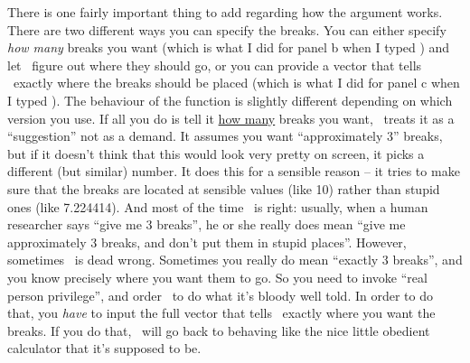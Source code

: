 There is one fairly important thing to add regarding how the  argument works. There are two different ways you can specify the breaks. You can either specify {\it how many} breaks you want (which is what I did for panel b when I typed ) and let \R\ figure out where they should go, or you can provide a vector that tells \R\ exactly where the breaks should be placed (which is what I did for panel c when I typed ). The behaviour of the  function is slightly different depending on which version you use. If all you do is tell it \underline{how many} breaks you want, \R\ treats it as a ``suggestion'' not as a demand. It assumes you want ``approximately 3'' breaks, but if it doesn't think that this would look very pretty on screen, it picks a different (but similar) number. It does this for a sensible reason -- it tries to make sure that the breaks are located at sensible values (like 10) rather than stupid ones (like 7.224414). And most of the time \R\ is right: usually, when a human researcher says ``give me 3 breaks'', he or she really does mean ``give me approximately 3 breaks, and don't put them in stupid places''. However, sometimes \R\ is dead wrong. Sometimes you really do mean ``exactly 3 breaks'', and you know precisely where you want them to go.  So you need to invoke ``real person privilege'', and order \R\ to do what it's bloody well told. In order to do that, you {\it have} to input the full vector that tells \R\ exactly where you want the breaks. If you do that, \R\ will go back to behaving like the nice little obedient calculator that it's supposed to be. 


